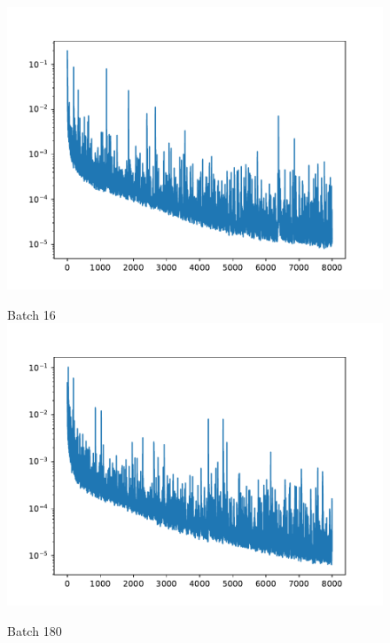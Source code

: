 \documentclass[USenglish]{article}
\newcommand{\1}{\begin{pmatrix}
		1\\
		1
\end{pmatrix}}
\begin{document}
\begin{figure}
\begin{minipage}{0.32\textwidth}
\includegraphics[width=\textwidth, trim={20 0 45 30}, clip]{loss_convAE_trial_002_batch_004.pdf}
\end{minipage}
\begin{minipage}{0.32\textwidth}
\centering
Batch 16\\
\includegraphics[width=\textwidth, trim={20 0 45 30}, clip]{loss_convAE_trial_002_batch_016.pdf}
\end{minipage}
\begin{minipage}{0.32\textwidth}
\centering
Batch 180\\

\end{minipage}
\end{figure}
\end{document}

